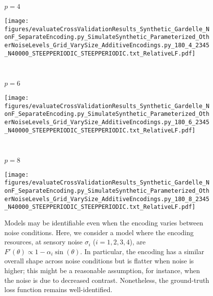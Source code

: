 \documentclass[si.tex]{subfiles}
\begin{document}
\begin{figure}
\begin{minipage}[b]{0.45\linewidth}
  \end{minipage}%
  \hfill
  \begin{minipage}[b]{0.45\linewidth}
    \centering

$p=4$


\texttt{[image: figures/evaluateCrossValidationResults\_Synthetic\_Gardelle\_NonF\_SeparateEncoding.py\_SimulateSynthetic\_Parameterized\_OtherNoiseLevels\_Grid\_VarySize\_AdditiveEncodings.py\_180\_4\_2345\_N40000\_STEEPPERIODIC\_STEEPPERIODIC.txt\_RelativeLF.pdf]}

\ 

$p=6$

\texttt{[image: figures/evaluateCrossValidationResults\_Synthetic\_Gardelle\_NonF\_SeparateEncoding.py\_SimulateSynthetic\_Parameterized\_OtherNoiseLevels\_Grid\_VarySize\_AdditiveEncodings.py\_180\_6\_2345\_N40000\_STEEPPERIODIC\_STEEPPERIODIC.txt\_RelativeLF.pdf]}

\ 

$p=8$

\texttt{[image: figures/evaluateCrossValidationResults\_Synthetic\_Gardelle\_NonF\_SeparateEncoding.py\_SimulateSynthetic\_Parameterized\_OtherNoiseLevels\_Grid\_VarySize\_AdditiveEncodings.py\_180\_8\_2345\_N40000\_STEEPPERIODIC\_STEEPPERIODIC.txt\_RelativeLF.pdf]}


\end{minipage}



\caption{Models may be identifiable even when the encoding varies between noise conditions. Here, we consider a model where the encoding resources, at sensory noise $\sigma_i$ ($i=1,2,3,4$), are $F'(\theta) \propto 1-\alpha_i \sin(\theta)$. In particular, the encoding has a similar overall shape across noise conditions but is flatter when noise is higher; this might be a reasonable assumption, for instance, when the noise is due to decreased contrast. Nonetheless, the ground-truth loss function remains well-identified.}\label{fig:encoding-varies-additive}
\end{figure}
\end{document}
